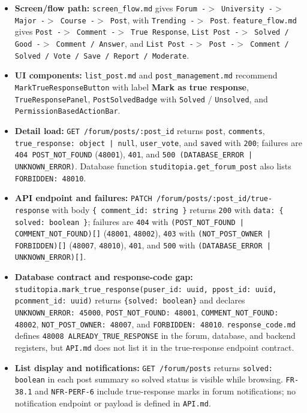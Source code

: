 \documentclass[12pt]{article}
\begin{document}
\begin{itemize}
\item \textbf{Screen/flow path:} \texttt{screen\_flow.md} gives \texttt{Forum -$>$ University -$>$ Major -$>$ Course -$>$ Post}, with \texttt{Trending -$>$ Post}. \texttt{feature\_flow.md} gives \texttt{Post -$>$ Comment -$>$ True Response}, \texttt{List Post -$>$ Solved / Good -$>$ Comment / Answer}, and \texttt{List Post -$>$ Post -$>$ Comment / Solved / Vote / Save / Report / Moderate}.
\item \textbf{UI components:} \texttt{list\_post.md} and \texttt{post\_management.md} recommend \texttt{MarkTrueResponseButton} with label \textbf{Mark as true response}, \texttt{TrueResponsePanel}, \texttt{PostSolvedBadge} with \texttt{Solved} / \texttt{Unsolved}, and \texttt{PermissionBasedActionBar}.
\item \textbf{Detail load:} \texttt{GET /forum/posts/:post\_id} returns \texttt{post}, \texttt{comments}, \texttt{true\_response: object | null}, \texttt{user\_vote}, and \texttt{saved} with \texttt{200}; failures are \texttt{404 POST\_NOT\_FOUND} (\texttt{48001}), \texttt{401}, and \texttt{500 (DATABASE\_ERROR | UNKNOWN\_ERROR)}. Database function \texttt{studitopia.get\_forum\_post} also lists \texttt{FORBIDDEN: 48010}.
\item \textbf{API endpoint and failures:} \texttt{PATCH /forum/posts/:post\_id/true-response} with body \texttt{\{ comment\_id: string \}} returns \texttt{200} with \texttt{data: \{ solved: boolean \}}; failures are \texttt{404} with \texttt{(POST\_NOT\_FOUND | COMMENT\_NOT\_FOUND)[]} (\texttt{48001}, \texttt{48002}), \texttt{403} with \texttt{(NOT\_POST\_OWNER | FORBIDDEN)[]} (\texttt{48007}, \texttt{48010}), \texttt{401}, and \texttt{500} with \texttt{(DATABASE\_ERROR | UNKNOWN\_ERROR)[]}.
\item \textbf{Database contract and response-code gap:} \texttt{studitopia.mark\_true\_response(puser\_id: uuid, ppost\_id: uuid, pcomment\_id: uuid)} returns \texttt{\{solved: boolean\}} and declares \texttt{UNKNOWN\_ERROR: 45000}, \texttt{POST\_NOT\_FOUND: 48001}, \texttt{COMMENT\_NOT\_FOUND: 48002}, \texttt{NOT\_POST\_OWNER: 48007}, and \texttt{FORBIDDEN: 48010}. \texttt{response\_code.md} defines \texttt{48008 ALREADY\_TRUE\_RESPONSE} in the forum, database, and backend registers, but \texttt{API.md} does not list it in the true-response endpoint contract.
\item \textbf{List display and notifications:} \texttt{GET /forum/posts} returns \texttt{solved: boolean} in each post summary so solved status is visible while browsing. \texttt{FR-38.1} and \texttt{NFR-PERF-6} include true-response marks in forum notifications; no notification endpoint or payload is defined in \texttt{API.md}.
\end{itemize}
\par\medskip
\end{document}
